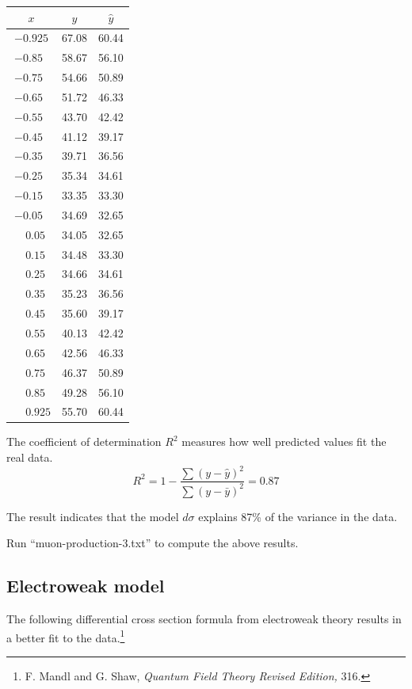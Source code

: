 \documentclass[12pt]{article}
\begin{document}
\begin{center}
\begin{tabular}{|c|c|c|}
\hline
$x$ & $y$ & $\hat{y}$ \\
\hline
$-0.925$ & 67.08 & 60.44\\
$-0.85\phantom{0}$ & 58.67 & 56.10\\
$-0.75\phantom{0}$ & 54.66 & 50.89\\
$-0.65\phantom{0}$ & 51.72 & 46.33\\
$-0.55\phantom{0}$ & 43.70 & 42.42\\
$-0.45\phantom{0}$ & 41.12 & 39.17\\
$-0.35\phantom{0}$ & 39.71 & 36.56\\
$-0.25\phantom{0}$ & 35.34 & 34.61\\
$-0.15\phantom{0}$ & 33.35 & 33.30\\
$-0.05\phantom{0}$ & 34.69 & 32.65\\
$\phantom{+}0.05\phantom{0}$ & 34.05 & 32.65\\
$\phantom{+}0.15\phantom{0}$ & 34.48 & 33.30\\
$\phantom{+}0.25\phantom{0}$ & 34.66 & 34.61\\
$\phantom{+}0.35\phantom{0}$ & 35.23 & 36.56\\
$\phantom{+}0.45\phantom{0}$ & 35.60 & 39.17\\
$\phantom{+}0.55\phantom{0}$ & 40.13 & 42.42\\
$\phantom{+}0.65\phantom{0}$ & 42.56 & 46.33\\
$\phantom{+}0.75\phantom{0}$ & 46.37 & 50.89\\
$\phantom{+}0.85\phantom{0}$ & 49.28 & 56.10\\
$\phantom{+}0.925$ & 55.70 & 60.44\\
\hline
\end{tabular}
\end{center}

\noindent
The coefficient of determination $R^2$ measures how well predicted values fit the real data.
\begin{equation*}
R^2=1-\frac{\sum(y-\hat{y})^2}{\sum(y-\bar{y})^2}=0.87
\end{equation*}

\noindent
The result indicates that the model $d\sigma$ explains 87\% of the variance in the data.

\bigskip
\noindent
Run ``muon-production-3.txt'' to compute the above results.

\subsection*{Electroweak model}
The following differential cross section formula from electroweak
theory results in a better fit to the
data.\footnote{F. Mandl and G. Shaw, {\it Quantum Field Theory Revised Edition,} 316.}
\end{document}

